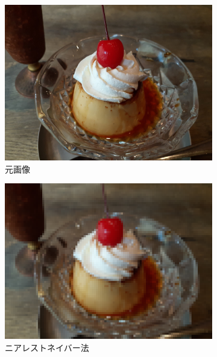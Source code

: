 \documentclass[../../index]{subfiles}
\begin{document}
\begin{figure}[htbp]
  \centering
  \begin{subfigure}{0.5\linewidth}
    \centering
    \includegraphics[width=\smallfiguresize]{pudding.jpeg}
    \caption{元画像}
  \end{subfigure}%
  \begin{subfigure}{0.5\linewidth}
    \centering
    \includegraphics[width=\smallfiguresize]{nearest.png}
    \caption{ニアレストネイバー法}
  \end{subfigure}
  \hfill\vspace{\baselineskip}
  \begin{subfigure}{0.5\linewidth}
    \centering

\end{subfigure}
\end{figure}
\end{document}
